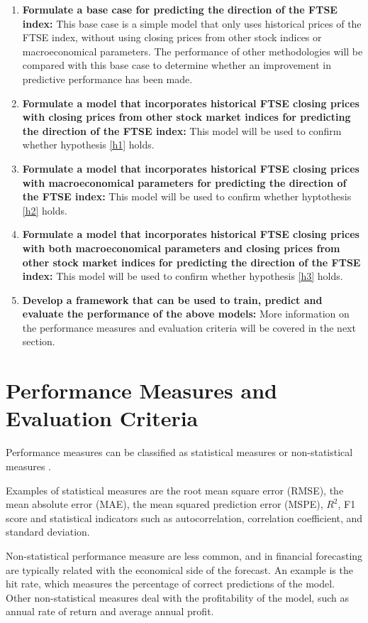 \documentclass{UoYCSproject}
\begin{document}
\begin{enumerate}
    \item \label{basecase} \textbf{Formulate a base case for predicting the direction of the FTSE index:} This base case is a simple model that only uses historical prices of the FTSE index, without using closing prices from other stock indices or macroeconomical parameters. The performance of other methodologies will be compared with this base case to determine whether an improvement in predictive performance has been made.  
    \item \textbf{Formulate a model that incorporates historical FTSE closing prices with closing prices from other stock market indices for predicting the direction of the FTSE index:} This model will be used to confirm whether hypothesis \ref{h1} holds.
    \item \textbf{Formulate a model that incorporates historical FTSE closing prices with macroeconomical parameters for predicting the direction of the FTSE index:} This model will be used to confirm whether hyptothesis \ref{h2} holds.
    \item \textbf{Formulate a model that incorporates historical FTSE closing prices with both macroeconomical parameters and closing prices from other stock market indices for predicting the direction of the FTSE index:} This model will be used to confirm whether hypothesis \ref{h3} holds.
    \item \label{framework} \textbf{Develop a framework that can be used to train, predict and evaluate the performance of the above models:} More information on the performance measures and evaluation criteria will be covered in the next section. 
\end{enumerate}

\section{Performance Measures and Evaluation Criteria}
Performance measures can be classified as statistical measures or non-statistical measures \cite{atsalakis2009surveying}.

Examples of statistical measures are the root mean square error (RMSE), the mean absolute error (MAE), the mean squared prediction error (MSPE), $R^2$, F1 score and statistical indicators such as autocorrelation, correlation coefficient, and standard deviation. 

Non-statistical performance measure are less common, and in financial forecasting are typically related with the economical side of the forecast. An example is the hit rate, which measures the percentage of correct predictions of the model. Other non-statistical measures deal with the profitability of the model, such as annual rate of return and average annual profit.
\end{document}
